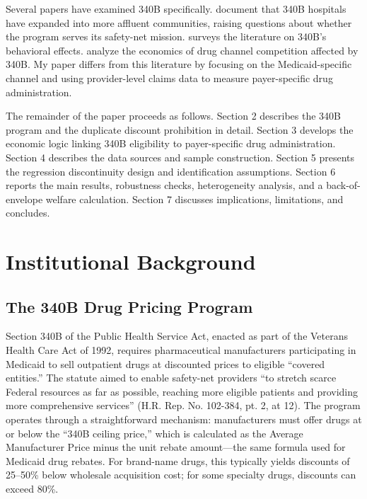 \documentclass[12pt]{article}
\begin{document}
Several papers have examined 340B specifically. \citet{conti2019340b} document that 340B hospitals have expanded into more affluent communities, raising questions about whether the program serves its safety-net mission. \citet{hyman2020how} surveys the literature on 340B's behavioral effects. \citet{frank2020economics} analyze the economics of drug channel competition affected by 340B. My paper differs from this literature by focusing on the Medicaid-specific channel and using provider-level claims data to measure payer-specific drug administration.

The remainder of the paper proceeds as follows. Section 2 describes the 340B program and the duplicate discount prohibition in detail. Section 3 develops the economic logic linking 340B eligibility to payer-specific drug administration. Section 4 describes the data sources and sample construction. Section 5 presents the regression discontinuity design and identification assumptions. Section 6 reports the main results, robustness checks, heterogeneity analysis, and a back-of-envelope welfare calculation. Section 7 discusses implications, limitations, and concludes.


\section{Institutional Background}

\subsection{The 340B Drug Pricing Program}

Section 340B of the Public Health Service Act, enacted as part of the Veterans Health Care Act of 1992, requires pharmaceutical manufacturers participating in Medicaid to sell outpatient drugs at discounted prices to eligible ``covered entities.'' The statute aimed to enable safety-net providers ``to stretch scarce Federal resources as far as possible, reaching more eligible patients and providing more comprehensive services'' (H.R. Rep. No. 102-384, pt. 2, at 12). The program operates through a straightforward mechanism: manufacturers must offer drugs at or below the ``340B ceiling price,'' which is calculated as the Average Manufacturer Price minus the unit rebate amount---the same formula used for Medicaid drug rebates. For brand-name drugs, this typically yields discounts of 25--50\% below wholesale acquisition cost; for some specialty drugs, discounts can exceed 80\%.
\end{document}
